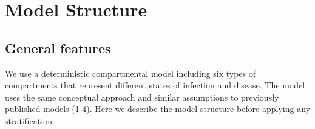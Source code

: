 
\section{Model Structure}

\subsection{General features}

We use a deterministic compartmental model including six types of compartments that represent different states of infection and disease. 
The model uses the same conceptual approach and similar assumptions to previously published models (1-4). 
Here we describe the model structure before applying any stratification.
